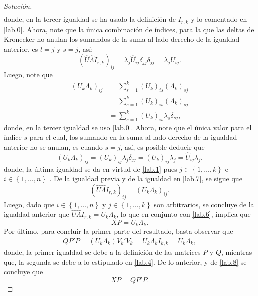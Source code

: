 \documentclass[10.5pt,notitlepage]{article}
\newenvironment{solucion}
  {\begin{proof}[Solución]}
  {\end{proof}}
\newcommand{\kis}[1]{\left\{ #1 \right\}}
\theoremstyle{plain}
\begin{document}
\begin{solucion}
\begin{align*}
\end{align*}
donde, en la tercer igualdad se ha usado la definición de \(I_{r,k}\) y lo comentado en \eqref{lab.0}. Ahora, note que la única combinación de índices, para la que las deltas de Kronecker no anulan los sumandos de la suma al lado derecho de la igualdad anterior, es \(l = j\) y \(s = j\), así: 
\begin{equation}\label{lab.7}
    (\hat{U}\hat{\Lambda}I_{r,k})_{ij} =   \lambda_{j}\hat{U}_{ij}\delta_{jj}\delta_{jj} = \lambda_{j}\hat{U}_{ij}.  
\end{equation}
Luego, note que 
\begin{align*}
  (U_{k}\Lambda_{k})_{ij} &= \sum_{s = 1}^{k}(U_{k})_{is}(\Lambda_{k})_{sj} \\ 
                   &=  \sum_{s = 1}^{k}(U_{k})_{is}(\Lambda_{k})_{sj} \\ 
                   &= \sum_{s = 1}^{k}(U_{k})_{is}\lambda_{s}\delta_{sj}, 
\end{align*}
donde, en la tercer igualdad se uso \eqref{lab.0}. Ahora, note que el única valor para el índice \(s\) para el cual, los sumando en la suma al lado derecho de la igualdad anterior no se anulan, es cuando \(s = j\), así, es posible deducir que 
\[
  (U_{k}\Lambda_{k})_{ij} = (U_{k})_{ij}\lambda_{j}\delta_{jj} =  (U_{k})_{ij}\lambda_{j} = \hat{U}_{ij}\lambda_{j}. 
\]
donde, la última igualdad se da en virtud de \eqref{lab.1} pues \(j \in \kis{1, \hdots, k}\) e \(i \in \kis{1, \hdots, n}\) . De la igualdad previa y de la igualdad en \eqref{lab.7}, se sigue que
\[
  (\hat{U}\hat{\Lambda}I_{r,k})_{ij}  =  (U_{k}\Lambda_{k})_{ij}. 
\]
Luego, dado que \(i \in \kis{1, \hdots, n}\) y \(j \in \kis{1, \hdots, k}\) son arbitrarios, se concluye de la igualdad anterior que \(\hat{U}\hat{\Lambda}I_{r,k}  = U_{k}\Lambda_{k}\), lo que en conjunto con \eqref{lab.6}, implica que 
\begin{equation}\label{lab.8}
    XP =  U_{k}\Lambda_{k}.
\end{equation}
Por último, para concluir la primer parte del resultado, basta observar que
\begin{align*}
    QP'P = (U_{k}\Lambda_{k})V_{k}'V_{k} = U_{k}\Lambda_{k}I_{k,k} =  U_{k}\Lambda_{k},
\end{align*}
donde, la primer igualdad se debe a la definición de las matrices \(P\) y \(Q\), mientras que, la segunda se debe a lo estipulado en \eqref{lab.4}. De lo anterior, y de \eqref{lab.8} se concluye que 
\begin{equation}\label{lab.9}
    XP =   QP'P.

\end{equation}
\end{solucion}
\end{document}
